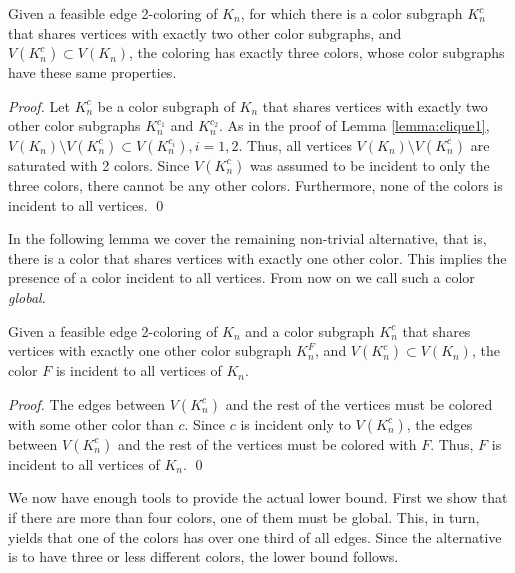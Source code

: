 \documentclass[runningheads, a4paper]{llncs}
\begin{document}
\begin{lemma}\label{lemma:clique2}
Given a feasible edge 2-coloring of $K_n$, for which there is a color subgraph $K_n^{c}$ that shares vertices with exactly two other color subgraphs, and $V(K_n^{c}) \subset V(K_n)$, the coloring has exactly three colors, whose color subgraphs have these same properties.
\end{lemma}
\begin{proof}
Let $K_n^{c}$ be a color subgraph of $K_n$ that shares vertices with exactly two other color subgraphs $K_n^{c_1}$ and $K_n^{c_2}$. As in the proof of Lemma \ref{lemma:clique1}, $V(K_n) \setminus V(K_n^{c}) \subset V(K_n^{c_i}), i = 1,2$. Thus, all vertices $V(K_n) \setminus V(K_n^{c})$ are saturated with 2 colors. Since $V(K_n^{c})$ was assumed to be incident to only the three colors, there cannot be any other colors. Furthermore, none of the colors is incident to all vertices. \qed
\end{proof}

In the following lemma we cover the remaining non-trivial alternative, that is, there is a color that shares vertices with exactly one other color. This implies the presence of a color incident to all vertices. From now on we call such a color \textit{global}.

\begin{lemma}\label{lemma:clique3}
Given a feasible edge 2-coloring of $K_n$ and a color subgraph $K_n^c$ that shares vertices with exactly one other color subgraph $K_n^F$, and $V(K_n^c) \subset V(K_n)$, the color $F$ is incident to all vertices of $K_n$.
\end{lemma}
\begin{proof}
The edges between $V(K_n^c)$ and the rest of the vertices must be colored with some other color than $c$. Since $c$ is incident only to $V(K_n^c)$, the edges between $V(K_n^c)$ and the rest of the vertices must be colored with $F$. Thus, $F$ is incident to all vertices of $K_n$. \qed
\end{proof}

We now have enough tools to provide the actual lower bound. First we show that if there are more than four colors, one of them must be global. This, in turn, yields that one of the colors has over one third of all edges. Since the alternative is to have three or less different colors, the lower bound follows.
\end{document}
